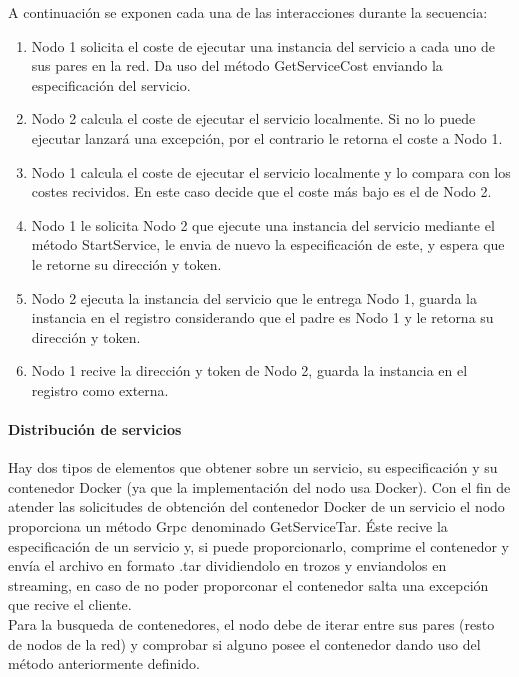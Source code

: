\documentclass[11pt]{article}
\begin{document}
				A continuación se exponen cada una de las interacciones durante la secuencia:
				\begin{enumerate}
					\item Nodo 1 solicita el coste de ejecutar una instancia del servicio a cada uno de sus pares en la red. Da uso del método GetServiceCost enviando la especificación del servicio.
					\item Nodo 2 calcula el coste de ejecutar el servicio localmente. Si no lo puede ejecutar lanzará una excepción, por el contrario le retorna el coste a Nodo 1.
					\item Nodo 1 calcula el coste de ejecutar el servicio localmente y lo compara con los costes recividos. En este caso decide que el coste más bajo es el de Nodo 2.
					\item Nodo 1 le solicita Nodo 2 que ejecute una instancia del servicio mediante el método StartService, le envia de nuevo la especificación de este, y espera que le retorne 
						su dirección y token.
					\item Nodo 2 ejecuta la instancia del servicio que le entrega Nodo 1, guarda la instancia en el registro considerando que el padre es Nodo 1 y le retorna su dirección y token.
					\item Nodo 1 recive la dirección y token de Nodo 2, guarda la instancia en el registro como externa.
				\end{enumerate}	

			\paragraph{Distribución de servicios}
				Hay dos tipos de elementos que obtener sobre un servicio, su especificación y su contenedor Docker (ya que la implementación del nodo usa Docker).
				Con el fin de atender las solicitudes de obtención del contenedor Docker de un servicio el nodo proporciona un método Grpc denominado GetServiceTar. 
				Éste recive la especificación de un servicio y, si puede 
				proporcionarlo, comprime el contenedor y envía el archivo en formato .tar dividiendolo en trozos y enviandolos en streaming, en caso de no poder proporconar el contenedor salta una excepción que
				recive el cliente.\\
				Para la busqueda de contenedores, el nodo debe de iterar entre sus pares (resto de nodos de la red) y comprobar si alguno posee el contenedor dando uso del método anteriormente definido. \\
				
\end{document}
